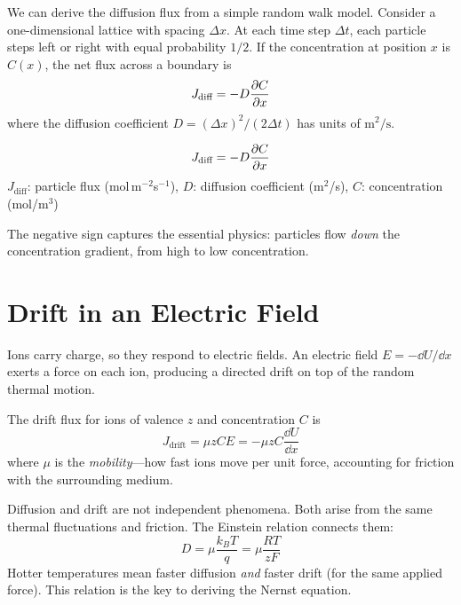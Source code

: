 We can derive the diffusion flux from a simple random walk model. Consider a one-dimensional lattice with spacing $\Delta x$. At each time step $\Delta t$, each particle steps left or right with equal probability $1/2$. If the concentration at position $x$ is $C(x)$, the net flux across a boundary is
%
\begin{equation}
  J_{\text{diff}} = -D \frac{\partial C}{\partial x}
  \label{eq:fick}
\end{equation}
%
where the diffusion coefficient $D = (\Delta x)^2 / (2\Delta t)$ has units of $\text{m}^2/\text{s}$.

\begin{keyequation}
\begin{equation*}
  J_{\text{diff}} = -D \frac{\partial C}{\partial x}
\end{equation*}
\tcblower
$J_{\text{diff}}$: particle flux (mol$\,$m$^{-2}$s$^{-1}$), $D$: diffusion coefficient (m$^2$/s), $C$: concentration (mol/m$^3$)
\end{keyequation}

The negative sign captures the essential physics: particles flow \emph{down} the concentration gradient, from high to low concentration.


\section{Drift in an Electric Field}
\label{sec:drift}

Ions carry charge, so they respond to electric fields. An electric field $E = -\dd U / \dd x$ exerts a force on each ion, producing a directed drift on top of the random thermal motion.

The drift flux for ions of valence $z$ and concentration $C$ is
%
\begin{equation}
  J_{\text{drift}} = \mu z C E = -\mu z C \frac{\dd U}{\dd x}
  \label{eq:drift}
\end{equation}
%
where $\mu$ is the \emph{mobility}---how fast ions move per unit force, accounting for friction with the surrounding medium.

\begin{aside}
Diffusion and drift are not independent phenomena. Both arise from the same thermal fluctuations and friction. The Einstein relation connects them:
\[
  D = \mu \frac{k_B T}{q} = \mu \frac{RT}{zF}
\]
Hotter temperatures mean faster diffusion \emph{and} faster drift (for the same applied force). This relation is the key to deriving the Nernst equation.
\end{aside}

